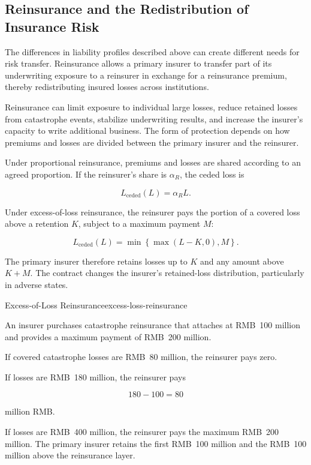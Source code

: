 \subsection{Reinsurance and the Redistribution of Insurance Risk}


The differences in liability profiles described above can create different needs for risk transfer. Reinsurance allows a primary insurer to transfer part of its underwriting exposure to a reinsurer in exchange for a reinsurance premium, thereby redistributing insured losses across institutions.


Reinsurance can limit exposure to individual large losses, reduce retained losses from catastrophe events, stabilize underwriting results, and increase the insurer's capacity to write additional business. The form of protection depends on how premiums and losses are divided between the primary insurer and the reinsurer.

Under proportional reinsurance, premiums and losses are shared according to an agreed proportion. If the reinsurer's share is $\alpha_R$, the ceded loss is

\begin{equation}
L_{\mathrm{ceded}}(L)=\alpha_R L.
\label{eq:ch15-proportional-reinsurance-payoff}
\end{equation}

Under excess-of-loss reinsurance, the reinsurer pays the portion of a covered loss above a retention $K$, subject to a maximum payment $M$:

\begin{equation}
L_{\mathrm{ceded}}(L)=\min\left\{\max(L-K,0),M\right\}.
\label{eq:ch15-excess-of-loss}
\end{equation}

The primary insurer therefore retains losses up to $K$ and any amount above $K+M$. The contract changes the insurer's retained-loss distribution, particularly in adverse states.

\begin{example}{Excess-of-Loss Reinsurance}{excess-loss-reinsurance}

An insurer purchases catastrophe reinsurance that attaches at RMB~100 million and provides a maximum payment of RMB~200 million.

If covered catastrophe losses are RMB~80 million, the reinsurer pays zero.

If losses are RMB~180 million, the reinsurer pays

\[
180-100=80
\]

million RMB.

If losses are RMB~400 million, the reinsurer pays the maximum RMB~200 million. The primary insurer retains the first RMB~100 million and the RMB~100 million above the reinsurance layer.

\end{example}

